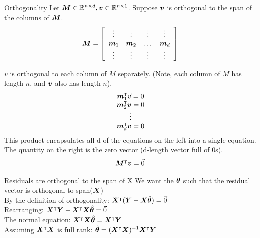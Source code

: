 \documentclass[aspectratio=169]{../latex_main/tntbeamer}  %
\begin{document}
	
	\begin{frame}{Orthogonality}
	\vspace{-2em}
	Let $\bm{M} \in \mathbb{R}^{n\times d}, \bm{v} \in \mathbb{R}^{n\times 1}$.  Suppose $\bm{v}$ is orthogonal to the span of the columns of $\bm{M}$.
	    \begin{align*}
	   \bm{M} =  \left[\begin{array}{cccc}
                \vdots & \vdots & \vdots & \vdots\\
                \bm{m}_1 &  \bm{m}_2 & \dots & \bm{m}_d\\
                \vdots & \vdots & \vdots & \vdots
            \end{array}\right]
            \end{align*}
            
            $v$ is orthogonal to each column of $M$ separately. 
(Note, each column of $M$ has length $n$, and $\bm{v}$ also has length $n$).
        \begin{equation*}
            \begin{array}{c}
                \bm{m}_1^\intercal \vec{v} = 0\\
                \bm{m}_2^\intercal \bm{v} = 0\\
                \vdots\\
                \bm{m}_d^\intercal \bm{v} = 0\\
            \end{array}
        \end{equation*}
            This product encapsulates all d of the equations on the left into a single equation. The quantity on the right is the zero vector (d-length vector full of 0s).
            \begin{align*}
                 \bm{M}^\intercal \bm{v} = \Vec{0}
            \end{align*}
	\end{frame}
	
	
	\begin{frame}{Residuals are orthogonal to the span of X}
	We want the $\bm{\theta}$ such that the residual vector is orthogonal to  span($\bm{X}$)\\
	\bigskip
	By the definition of orthogonality:
    $\bm{X}^\intercal(\bm{Y} - \bm{X}\hat{\bm{\theta}}) = \Vec{0}$\\
    \bigskip
    Rearranging: $\bm{X}^\intercal\bm{Y} - \bm{X}^\intercal\bm{X}\hat{\bm{\theta}} = \Vec{0}$\\
    \bigskip
    The normal equation: $\bm{X}^\intercal\bm{X}\hat{\bm{\theta}} = \bm{X}^\intercal\bm{Y} $\\
    \bigskip
    Assuming     $\bm{X}^\intercal\bm{X}$       is full rank: $\hat{\bm{\theta}} = (\bm{X}^\intercal\bm{X})^{-1} \bm{X}^\intercal\bm{Y} $\\

	\end{frame}
	
\end{document}
